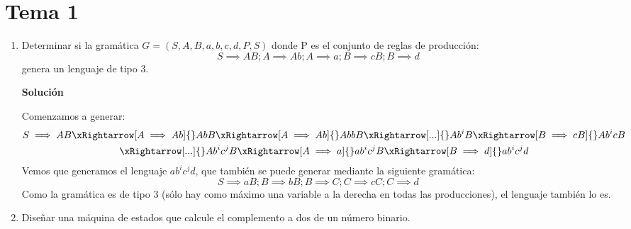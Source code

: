 \documentclass[12pt,spanish]{article}
\newenvironment{solution}{
	\par
	\textbf{Solución}
	\par
	\begin{center}
}
{
	\end{center}
}
\begin{document}
\section{Tema 1}

\begin{enumerate}
	\item Determinar si la gramática $G=({S,A,B},{a,b,c,d},P,S)$ donde P es el conjunto de reglas de producción:
	\[
		S \implies AB ; A \implies Ab ; A \implies a ; B \implies cB ; B \implies d
	\]
	genera un lenguaje de tipo 3.
	\begin{solution}
		Comenzamos a generar:
		\begin{gather*}
			S \implies AB \xRightarrow[A \implies Ab]{} AbB \xRightarrow[A \implies Ab]{} AbbB \xRightarrow[...]{} Ab^iB \xRightarrow[B \implies cB]{} Ab^icB \\ \xRightarrow[...]{} Ab^ic^jB \xRightarrow[A \implies a]{} ab^ic^jB \xRightarrow[B \implies d]{} ab^ic^jd
		\end{gather*}
		Vemos que generamos el lenguaje ${ab^ic^jd}$, que también se puede generar mediante la siguiente gramática:
		\[
			S \implies aB ; B \implies bB ; B \implies C ; C \implies cC ; C \implies d
		\]
		Como la gramática es de tipo 3 (sólo hay como máximo una variable a la derecha en todas las producciones), el lenguaje también lo es.
	\end{solution}

	\item Diseñar una máquina de estados que calcule el complemento a dos de un número binario.


\end{enumerate}
\end{document}
